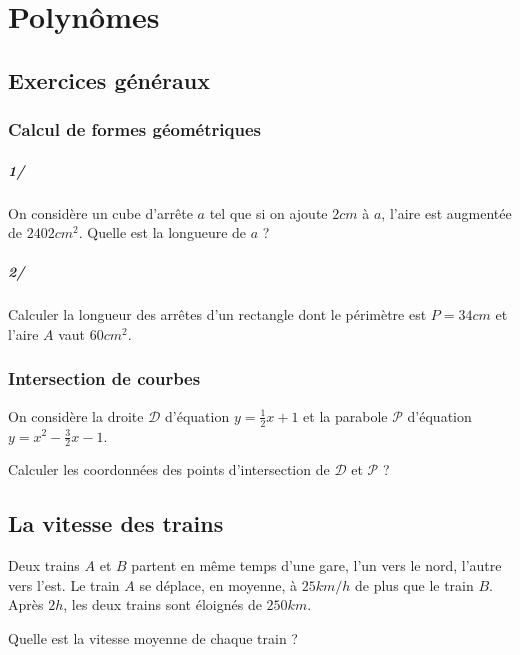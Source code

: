 \chapter{Polynômes}

    \section{Exercices généraux}

        \subsection{Calcul de formes géométriques}

            \paragraph{1/} On considère un cube d'arrête $a$ tel que si on ajoute $2cm$ à $a$, l'aire est augmentée de $2402cm^2$. Quelle est la longueure de $a$ ?

            \paragraph{2/} Calculer la longueur des arrêtes d'un rectangle dont le périmètre est $P=34cm$ et l'aire $A$ vaut $60cm^2$.

        \subsection{Intersection de courbes}

        On considère la droite $\mathscr{D}$ d'équation $y = \frac{1}{2}x +1$ et la parabole $\mathscr{P}$ d'équation $y = x^2 - \frac{3}{2}x -1$.
        
        Calculer les coordonnées des points d'intersection de $\mathscr{D}$ et $\mathscr{P}$ ?

    \section{La vitesse des trains}

        Deux trains $A$ et $B$ partent en même temps d'une gare, l'un vers le nord, l'autre vers l'est. Le train $A$ se déplace, en moyenne, 
        à $25km/h$ de plus que le train $B$. Après $2h$, les deux trains sont éloignés de $250km$.

        Quelle est la vitesse moyenne de chaque train ?